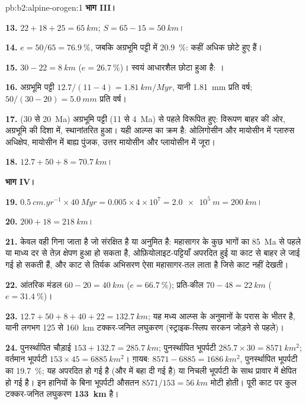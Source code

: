 \begin{solution}{pb:b2:alpine-orogen:1}
\noindent\textbf{भाग III।}

\textbf{13.} $22 + 18 + 25 = \qty{65}{km}$; $S = 65 - 15 = \qty{50}{km}$।

\textbf{14.} $e = 50/65 = \qty{76.9}{\percent}$, जबकि अग्रभूमि पट्टी में
\qty{20.9}{\percent}:  कहीं अधिक छोटे हुए हैं।

\textbf{15.} $30 - 22 = \qty{8}{km}$ ($e = \qty{26.7}{\percent}$)। स्वयं आधारशैल
छोटा हुआ है: ।

\textbf{16.} अग्रभूमि पट्टी $12.7/(11 - 4) = \qty{1.81}{km/Myr}$, यानी
\qty{1.81}{mm} प्रति वर्ष;  $50/(30 - 20) = \qty{5.0}{mm}$ प्रति वर्ष।

\textbf{17.}  (30 से \qty{20}{Ma}) अग्रभूमि पट्टी (11 से
\qty{4}{Ma}) से पहले विरूपित हुए: विरूपण बाहर की ओर, अग्रभूमि की दिशा में, स्थानांतरित हुआ। यही
आल्प्स का क्रम है: ओलिगोसीन और मायोसीन में ग्लारुस अधिक्षेप, मायोसीन में बाह्य पुंजक,
उत्तर मायोसीन और प्लायोसीन में जूरा।

\textbf{18.} $12.7 + 50 + 8 = \qty{70.7}{km}$।

\noindent\textbf{भाग IV।}

\textbf{19.} $\qty{0.5}{cm.yr^{-1}}\times\qty{40}{Myr} = 0.005\times4\times10^7 =
\qty{2.0e5}{m} = \qty{200}{km}$।

\textbf{20.} $200 + 18 = \qty{218}{km}$।

\textbf{21.} केवल वही गिना जाता है जो संरक्षित है या अनुमित है: महासागर के कुछ भागों का
\qty{85}{Ma} से पहले या माध्य दर से तेज़ क्षेपण हुआ हो सकता है, ओफ़ियोलाइट-पट्टियाँ
अपरदित हुई या काट से बाहर ले जाई गई हो सकती हैं, और काट से तिर्यक अभिसरण
ऐसा महासागर-तल लाता है जिसे काट नहीं देखती।

\textbf{22.} आंतरिक मंडल $60 - 20 = \qty{40}{km}$ ($e = \qty{66.7}{\percent}$); प्रति-कील
$70 - 48 = \qty{22}{km}$ ($e = \qty{31.4}{\percent}$)।

\textbf{23.} $12.7 + 50 + 8 + 40 + 22 = \qty{132.7}{km}$; यह मध्य आल्प्स के अनुमानों के परास के भीतर है,
यानी लगभग 125 से \qty{160}{km} टक्कर-जनित लघुकरण (स्ट्राइक-स्लिप सरकन जोड़ने से
पहले)।

\textbf{24.} पुनर्स्थापित चौड़ाई $153 + 132.7 = \qty{285.7}{km}$; पुनर्स्थापित भूपर्पटी
$285.7\times30 = \qty{8571}{km^2}$; वर्तमान भूपर्पटी $153\times45 = \qty{6885}{km^2}$। ग़ायब:
$8571 - 6885 = \qty{1686}{km^2}$, पुनर्स्थापित भूपर्पटी का \qty{19.7}{\percent}; यह
अपरदित हो गई है (और  में बहा दी गई है) या निचली भूपर्पटी के साथ प्रावार में
क्षेपित हो गई है। इन हानियों के बिना भूपर्पटी औसतन $8571/153 = \qty{56}{km}$ मोटी होती।
पूरी काट पर कुल टक्कर-जनित लघुकरण
\textbf{\qty[text-series-to-math=true]{133}{km}} है।
\end{solution}
